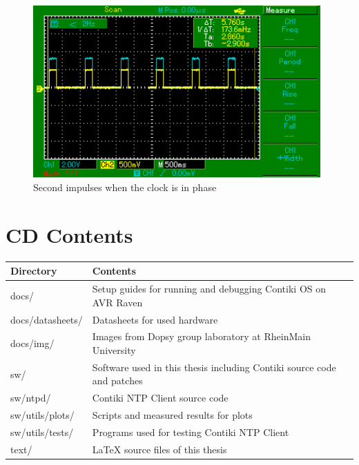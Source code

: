 \begin{figure}
  \centering
  \includegraphics[width=11cm,keepaspectratio]{fig/osc-in-phase.png}
  \caption{Second impulses when the clock is in phase}
  \label{fig:app-osc-in-phase}
  \bigskip
\end{figure}


\chapter{CD Contents}\label{app:cd-contents} %
\begin{tabular}{|l|l|}
	\hline
	Directory & Contents \\ \hline
	docs/ & Setup guides for running and debugging Contiki OS on AVR Raven\\
	docs/datasheets/ & Datasheets for used hardware\\
	docs/img/ & Images from Dopsy group laboratory at RheinMain University\\
	sw/ & Software used in this thesis including Contiki source code and patches\\
	sw/ntpd/ & Contiki NTP Client source code\\
	sw/utils/plots/ & Scripts and measured results for plots\\
	sw/utils/tests/ & Programs used for testing Contiki NTP Client\\
	text/ & LaTeX source files of this thesis\\
	\hline
\end{tabular}
